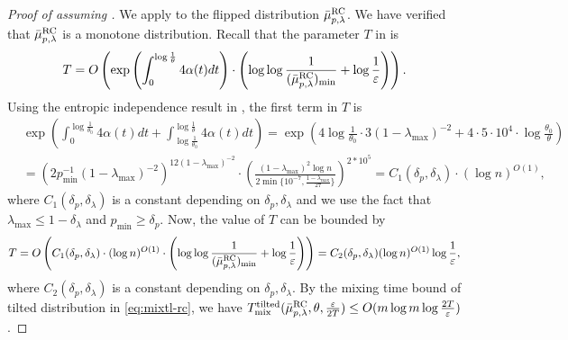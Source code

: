 \documentclass[11pt,a4paper]{article}
\renewcommand{\epsilon}{\varepsilon}
\newcommand{\mixtl}{T_{\textnormal{mix}}^{\textnormal{tilted}}}
\theoremstyle{definition}
\begin{document}
\begin{proof}[Proof of  assuming ]
    We apply  to the flipped distribution $\bar{\mu}_{p,\lambda}^{\textnormal{RC}}$. We have verified that $\bar{\mu}_{p,\lambda}^{\textnormal{RC}}$ is a monotone distribution. 
    Recall that the parameter $T$ in  is
    \begin{align*}
        T= O\left(\exp\left(\int_0^{\log \frac{1}{\theta}}4\alpha(t)dt\right)\cdot \left(\log \log \frac{1}{(\bar{\mu}_{p,\lambda}^{\textnormal{RC}})_{\min}}+\log \frac{1}{\epsilon}\right)\right).
    \end{align*}
    Using the entropic independence result in , the first term in $T$ is
    \begin{align*}
        &\exp\left(\int_0^{\log \frac{1}{\theta_0}}4\alpha(t)dt+\int_{\log \frac{1}{\theta_0}}^{\log \frac{1}{\theta}}4\alpha(t)dt\right) = \exp\left(4\log \frac{1}{\theta_0}\cdot3(1-\lambda_{\max})^{-2}+4\cdot5\cdot 10^4 \cdot \log \frac{\theta_0}{\theta}\right)\\
        &=(2p_{\min}^{-1}(1-\lambda_{\max})^{-2})^{12(1-\lambda_{\max})^{-2}}\cdot \left(\frac{ (1-\lambda_{\max})^2\log n}{2\min \{10^{-7},\frac{1-\lambda_{\max}}{27}\}}\right)^{2*10^5} =C_1(\delta_p,\delta_\lambda) \cdot (\log n)^{O(1)},
    \end{align*}
    where $C_1(\delta_p,\delta_\lambda)$ is a constant depending on $\delta_p,\delta_\lambda$ and we use the fact that $\lambda_{\max} \leq 1 - \delta_\lambda$ and $p_{\min} \geq \delta_p$. Now, the value of $T$ can be bounded by
    \begin{align*}
        T = O\left(C_1(\delta_p,\delta_\lambda) \cdot (\log n)^{O(1)}\cdot\left(\log \log \frac{1}{(\bar{\mu}_{p,\lambda}^{\textnormal{RC}})_{\min}}+\log \frac{1}{\epsilon}\right)\right)=C_2(\delta_p,\delta_\lambda)(\log n)^{O(1)}\log\frac{1}{\epsilon},
    \end{align*}
    where $C_2(\delta_p,\delta_\lambda)$ is a constant depending on $\delta_p,\delta_\lambda$.
    By the mixing time bound of tilted distribution in \eqref{eq:mixtl-rc}, we have 
    $\mixtl(\bar{\mu}_{p,\lambda}^{\textnormal{RC}},\theta,\frac{\epsilon}{2T}) \leq O(m \log m \log \frac{2T}{\epsilon})$.

\end{proof}
\end{document}
